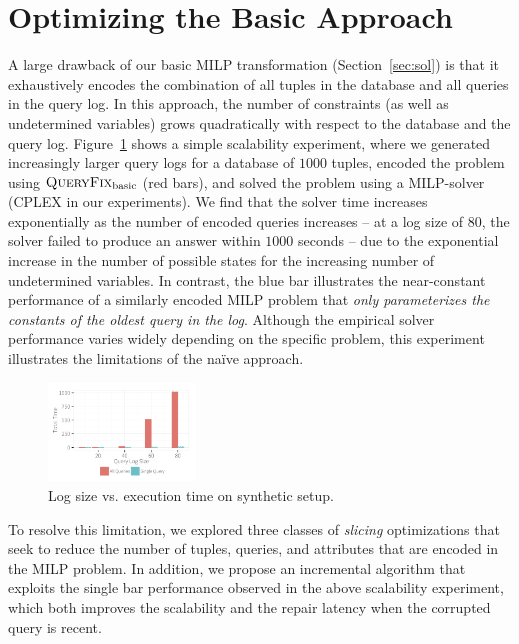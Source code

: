 
\section{Optimizing the Basic Approach}
\label{sec:opt}

A large drawback of our basic MILP transformation (Section~\ref{sec:sol}) is
that it exhaustively encodes the combination of all tuples in the database and all queries
in the query log.  In this approach, the number of constraints (as well as undetermined variables) 
grows quadratically with respect to the database and the query log.
Figure~\ref{fig:querysize_vs_time} shows a simple scalability experiment, where we generated increasingly 
larger query logs for a database of $1000$ tuples, encoded the problem using $\naive$ (red bars), 
and solved the problem using a MILP-solver (CPLEX in our experiments).
We find that the solver time increases exponentially as the number of encoded queries increases --
at a log size of $80$, the solver failed to produce an answer within $1000$ seconds --
due to the exponential increase in the number of possible states for the increasing number of undetermined variables.
In contrast, the blue bar illustrates the near-constant performance of a similarly encoded MILP problem that 
{\it only parameterizes the constants of the oldest query in the log}.
Although the empirical solver performance varies widely depending on the specific problem, 
this experiment illustrates the limitations of the na\"ive approach.

\begin{figure}[t]
    \centering
        \includegraphics[width=0.35\textwidth]{figures/qsize_time_badscale}
    \caption{Log size vs. execution time on synthetic setup. }
    \label{fig:querysize_vs_time}
\end{figure}

To resolve this limitation, we explored three classes of \emph{slicing} optimizations that seek to
reduce the number of tuples, queries, and attributes that are encoded in the MILP problem.
In addition, we propose an incremental algorithm that exploits the single bar performance observed
in the above scalability experiment, which both improves the scalability and the repair latency
when the corrupted query is recent.  




